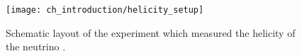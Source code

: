 
\begin{figure}
    \centering
    \texttt{[image: ch\_introduction/helicity\_setup]}
    \caption{
        Schematic layout of the experiment which measured
        the helicity of the neutrino \cite{helicity_measurement}.
    }
    \label{fig:lampshade}
\end{figure}

